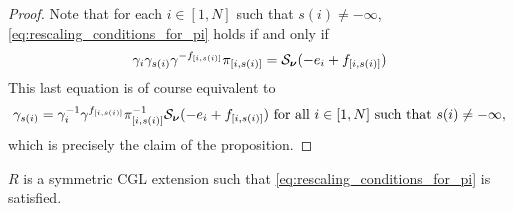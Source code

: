 \begin{proof}

	Note that for each $i \in [1, N]$ such that $s(i) \neq -\infty$,
	\cref{eq:rescaling_conditions_for_pi} holds if and only if
	\begin{equation*}
		\gamma_i \gamma_{s(i)} \gamma^{-f_{[i, s(i)]}}\pi_{[i, s(i)]} = \mathcal{S}_{\boldsymbol{\nu}}(-e_i + f_{[i, s(i)]})
	\end{equation*}
	This last equation is of course equivalent to
	\begin{equation*}
		\gamma_{s(i)} =  \gamma_{i}^{-1} \gamma^{f_{[i, s(i)]}}\pi_{[i, s(i)]}^{-1} \mathcal{S}_{\boldsymbol{\nu}}(-e_i + f_{[i, s(i)]}) \text{ for all } i \in [1, N] \text{ such that } s(i) \neq -\infty,
	\end{equation*}
	which is precisely the claim of the proposition.
\end{proof}

\begin{condition}\label{cond:normalization_generators}
	$R$ is a symmetric CGL extension such that \cref{eq:rescaling_conditions_for_pi} is satisfied.
\end{condition}

